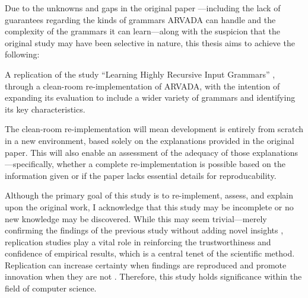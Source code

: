 Due to the unknowns and gaps in the original paper \cite{kulkarniLearningHighlyRecursive2021}—including the lack of guarantees regarding the kinds of grammars ARVADA can handle and the complexity of the grammars it can learn—along with the suspicion that the original study may have been selective in nature, this thesis aims to achieve the following:

\vspace{\baselineskip}
A replication of the study “Learning Highly Recursive Input Grammars” \cite{kulkarniLearningHighlyRecursive2021}, through a clean-room re-implementation of ARVADA, with the intention of expanding its evaluation to include a wider variety of grammars and identifying its key characteristics.

\vspace{\baselineskip}
The clean-room re-implementation will mean development is entirely from scratch in a new environment, based solely on the explanations provided in the original paper. This will also enable an assessment of the adequacy of those explanations—specifically, whether a complete re-implementation is possible based on the information given or if the paper lacks essential details for reproducability.

\vspace{\baselineskip}
Although the primary goal of this study is to re-implement, assess, and explain upon the original work, I acknowledge that this study may be incomplete or no new knowledge may be discovered. While this may seem trivial—merely confirming the findings of the previous study without adding novel insights \cite{hendriksConsiderItParsed}, replication studies play a vital role in reinforcing the trustworthiness and confidence of empirical results, which is a central tenet of the scientific method. Replication can increase certainty when findings are reproduced and promote innovation when they are not \cite{shepperdReplicationStudiesConsidered2018}. Therefore, this study holds significance within the field of computer science.

